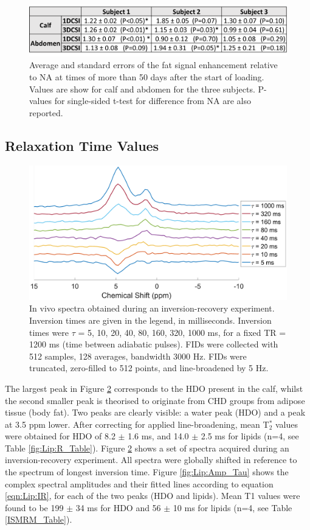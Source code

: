 \documentclass[class=article, crop=false]{standalone}
\begin{document}
\begin{figure}
    \centering
    \includegraphics[width=1\textwidth]{Figures/Lipid/Table.png}
    \caption{Average and standard errors of the fat signal enhancement relative to NA at times of more than 50 days after the start of loading. Values are show for calf and abdomen for the three subjects. P-values for single-sided t-test for difference from NA are also reported.}
    \label{fig:Lip:Amp_Table}
\end{figure}

\subsection{Relaxation Time Values}

\begin{figure}
    \centering
    \includegraphics[width=1\textwidth]{Figures/Lipid/NA_IR.png}
    \caption{In vivo spectra obtained during an inversion-recovery experiment. Inversion times are given in the legend, in milliseconds. Inversion times were $\tau$ = {5, 10, 20, 40, 80, 160, 320, 1000} ms, for a fixed TR = 1200 ms (time between adiabatic pulses). FIDs were collected with 512 samples, 128 averages, bandwidth 3000 Hz. FIDs were truncated, zero-filled to 512 points, and line-broadened by 5 Hz.}
    \label{fig:Lip:IR}
\end{figure}

The largest peak in Figure \ref{fig:Lip:IR} corresponds to the HDO present in the calf, whilst the second smaller peak is theorised to originate from CHD groups from adipose tissue (body fat). Two peaks are clearly visible: a water peak (HDO) and a peak at 3.5 ppm lower. After correcting for applied line-broadening, mean T$_2^*$ values were obtained for HDO of 8.2 $\pm$ 1.6 ms, and 14.0 $\pm$ 2.5 ms for lipids (n=4, see Table \ref{fig:Lip:R_Table}). Figure \ref{fig:Lip:IR} shows a set of spectra acquired during an inversion-recovery experiment. All spectra were globally shifted in reference to the spectrum of longest inversion time. Figure \ref{fig:Lip:Amp_Tau} shows the complex spectral amplitudes and their fitted lines according to equation \ref{eqn:Lip:IR}, for each of the two peaks (HDO and lipids). Mean T1 values were found to be 199 $\pm$ 34 ms for HDO and 56 $\pm$ 10 ms for lipids (n=4, see Table \ref{ISMRM_Table}).
\end{document}
